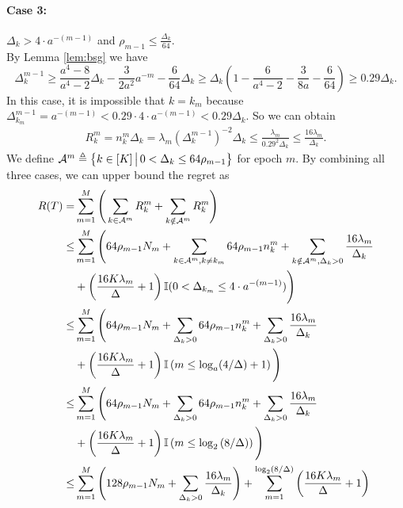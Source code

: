 \paragraph{Case 3:} $\Delta_k > 4 \cdot a^{-(m-1)}$ and $\rho_{m-1} \leq \frac{\Delta_k}{64}$.\\
By Lemma \ref{lem:bsg} we have
\[\Delta_k^{m-1} \geq \frac{a^4 - 8}{a^4 - 2}\Delta_k - \frac{3}{2a^2}a^{-m} - \frac{6}{64}\Delta_k \geq \Delta_k\left(1 - \frac{6}{a^4 - 2} - \frac{3}{8a} - \frac{6}{64}\right) \geq 0.29 \Delta_k.\]
In this case, it is impossible that $k=k_m$ because $\Delta_{k_m}^{m-1} = a^{-(m-1)} < 0.29\cdot 4\cdot a^{-(m-1)}<0.29\Delta_k$.
So we can obtain
\begin{align*}
   R_k^m= n_k^m \Delta_k = \lambda_m(\Delta_k^{m-1})^{-2} \Delta_k
    \leq \frac{\lambda_m}{0.29^2 \Delta_k} 
    \leq \frac{16\lambda_m}{\Delta_k}.
\end{align*}
We define ${\mathcal{A}}^m\triangleq\left\{ k\in[K]\,\big|\,0<\Delta_k\le 64\rho_{m-1} \right\}$ for epoch $m$. By combining all three cases, we can upper bound the regret as
\begin{equation}\label{eq:bb-regret}
\begin{split}
R(T)=&\sum_{m=1}^M\Bigg(\sum_{k \in \mathcal{A}^m} R_k^m + \sum_{k \notin \mathcal{A}^m} R_k^m\Bigg)\\    
\le& \sum_{m=1}^M\Bigg( 64\rho_{m-1}N_m+\sum_{k \in \mathcal{A}^m,k\neq k_m} 64\rho_{m-1}n_k^m + \sum_{k \notin \mathcal{A}^m, \Delta_k>0} \frac{16\lambda_m}{\Delta_k}\\
&+ \left(\frac{16K\lambda_m}{\Delta} + 1\right){\mathbb{I}}(0<\Delta_{k_m} \le 4 \cdot a^{-(m-1)}) \Bigg)\\
\le& \sum_{m=1}^M\Bigg( 64\rho_{m-1}N_m+\sum_{\Delta_k>0} 64\rho_{m-1}n_k^m + \sum_{\Delta_k>0} \frac{16\lambda_m}{\Delta_k} \\
&+ \left(\frac{16K\lambda_m}{\Delta} + 1\right){\mathbb{I}}\left(m\le \log_a(4/\Delta) + 1\right)\Bigg)\\ 
\le& \sum_{m=1}^M\Bigg( 64\rho_{m-1}N_m+\sum_{\Delta_k>0} 64\rho_{m-1}n_k^m + \sum_{\Delta_k>0} \frac{16\lambda_m}{\Delta_k}\\
&+ \left(\frac{16K\lambda_m}{\Delta} + 1\right){\mathbb{I}}\left(m\le \log_2\left(8/\Delta\right)\right)\Bigg)\\ 
\le& \sum_{m=1}^M\Bigg( 128\rho_{m-1}N_m + \sum_{\Delta_k>0} \frac{16\lambda_m}{\Delta_k}\Bigg)+ \sum_{m=1}^{\log_2(8/\Delta)}\left(\frac{16K\lambda_m}{\Delta} + 1\right)
\end{split}
\end{equation}
